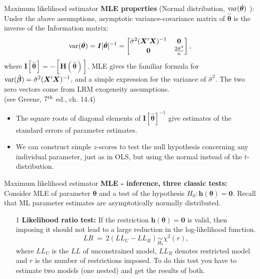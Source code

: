 \documentclass{beamer}
\begin{document}
\begin{frame}{Maximum likelihood estimator}
\textbf{MLE properties} (Normal distribution, $\textnormal{var}(\hat{\bm{\theta}})$ ):\\ \bigskip
\small
Under the above assumptions, asymptotic variance-covariance matrix of $\hat{\bm{\theta}}$ is the inverse of the Information matrix:\\ \medskip
$$
\textnormal{var}(\hat{\bm{\theta}})=\bm{I}[\hat{\bm{\theta}}]^{-1}=
\begin{bmatrix}
\hat{\sigma}^2(\bm{X}^{\prime}\bm{X})^{-1} & \bm{0} \\
\bm{0} & \frac{2\hat{\sigma}^4}{n}
\end{bmatrix},
$$
where $\bm{I}[\hat{\bm{\theta}}]=-[\bm{H}(\hat{\bm{\theta}})]$. MLE gives the familiar formula for $\textnormal{var}(\hat{\bm{\beta}}) = \hat{\sigma}^2(\bm{X}^{\prime}\bm{X})^{-1}$, and a simple expression for the variance of $\hat{\sigma}^2$. The two zero vectors come from LRM exogeneity assumptions. \\(see Greene, $7^{\textnormal{th}}$ ed., ch. 14.4)
\begin{itemize}
    \item The square roots of diagonal elements of $\bm{I}[\hat{\bm{\theta}}]^{-1}$ give estimates of the standard errors of parameter estimates.
    \item We can construct simple $z$-scores to test the null hypothesis concerning any individual parameter, just as in OLS, but using the normal instead of the $t$-distribution.
\end{itemize}
\end{frame}
\begin{frame}{Maximum likelihood estimator}
\textbf{MLE - inference, three classic tests:}\\ \medskip
Consider MLE of parameter $\bm{\theta}$ and a test of the hypothesis
$H_0 : \bm{h}(\bm{\theta}) = \bm{0}$. Recall that ML parameter
estimates are asymptotically normally distributed.\\ \medskip
\begin{itemize}
    \item[1] \textbf{Likelihood ratio test:} If the restriction $\bm{h}(\bm{\theta}) = \bm{0}$ is valid, then imposing it should not lead to a large reduction in the log-likelihood function.
    $$
    \textit{LR}~=~2(LL_U - LL_R) \underset{H_0}{\sim} \chi^2(r),
    $$
    where $LL_U$ is the $LL$ of unconstrained model, $LL_R$ denotes restricted model and $r$ is the number of restrictions imposed. To do this test you have to estimate two models (one nested) and get the results of both.
\end{itemize}
\end{frame}
\end{document}
